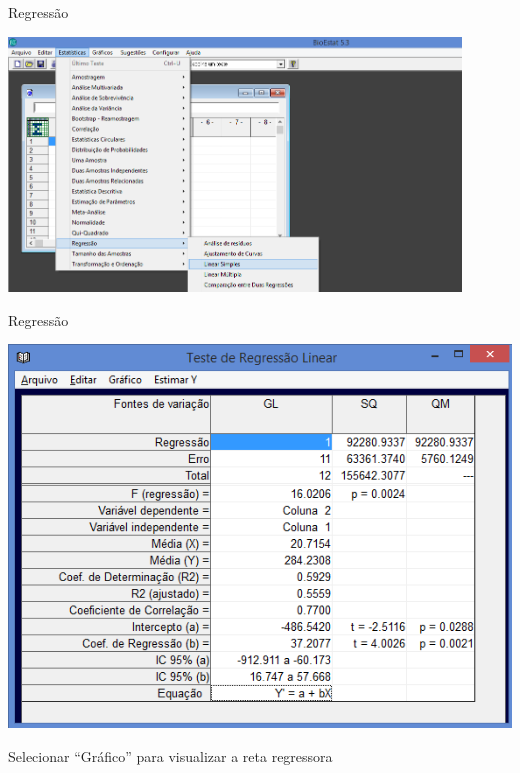 \documentclass{beamer}
\begin{document}
\begin{frame}{Regressão}
  \begin{center}
    \includegraphics[width=0.9\textwidth]{Pratica_Assoc/selecao_regressao}
  \end{center}
\end{frame}

\begin{frame}{Regressão}
  \begin{center}
    \includegraphics[height=0.7\textheight]{Pratica_Assoc/resultado_regressao}
  \end{center}

Selecionar ``Gráfico'' para visualizar a reta regressora
\end{frame}
\end{document}
